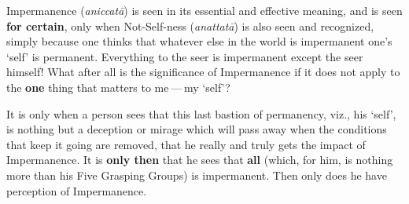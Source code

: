 Impermanence (\emph{aniccatā}) is seen in its essential and effective meaning, and is seen \textbf{for certain}, only when Not-Self-ness (\emph{anattatā}) is also seen and recognized, simply because one thinks that whatever else in the world is impermanent one's `self' is permanent. Everything to the seer is impermanent except the seer himself! What after all is the significance of Impermanence if it does not apply to the \textbf{one} thing that matters to me --- my `self'?

It is only when a person sees that this last bastion of permanency, viz., his `self', is nothing but a deception or mirage which will pass away when the conditions that keep it going are removed, that he really and truly gets the impact of Impermanence. It is \textbf{only then} that he sees that \textbf{all} (which, for him, is nothing more than his Five Grasping Groups) is impermanent. Then only does he have perception of Impermanence.
